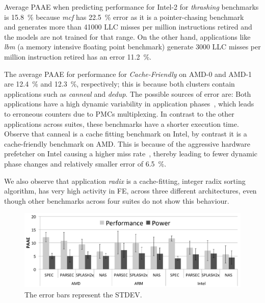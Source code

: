 {\small {}} Average PAAE when predicting performance for Intel-2 for
\textit{thrashing} benchmarks is \SI{15.8}{\percent} because \emph{mcf} has
\SI{22.5}{\percent} error as it is a pointer-chasing benchmark~\citep{2006core2} and
generates more than 41000 LLC misses per million instructions retired and the models are
not trained for that range. On the other hand, applications like \emph{lbm} (a memory
intensive floating point benchmark) generate 3000 LLC misses per million instruction
retired has an error \SI{11.2}{\percent}.

{\small {}} The average PAAE for performance for \textit{Cache-Friendly} on AMD-0 and
AMD-1 are \SI{12.4}{\percent} and \SI{12.3}{\percent}, respectively; this is because both
clusters  contain applications such as \emph{canneal} and \emph{dedup}. The possible
sources of error are: {\small {}} Both applications have a high dynamic
variability in application phases~\citep{marc}, which leads to erroneous counters due to
PMCs multiplexing. {\small {}} In contrast to the other applications across
suites, these benchmarks have a shorter execution time. {\small {}} Observe that
canneal is a cache fitting benchmark on Intel, by contrast it is a cache-friendly
benchmark on AMD. This is because of the aggressive hardware prefetcher on Intel causing a
higher miss rate~\citep{Kang:2013:HPP:2499368.2451155}, thereby leading to fewer dynamic
phase changes and relatively smaller error of \SI{6.5}{\percent}. 

We also observe that application \emph{radix} is a cache-fitting, integer radix sorting
algorithm, has very high activity in FE, across three different architectures, even though
other benchmarks across four suites do not show this behaviour. 

\begin{figure}[b]
    \centering
    \includegraphics[width=\textwidth]{Chapter3/Figs/single-core-online/SBAC-PAD/Cal-Summary.pdf}
    \caption[Average PAAE when predicting performance and power per benchmark suite on a single-core]{ The error bars represent the STDEV.}
    \label{fig: singlecore per suite}
\end{figure}


